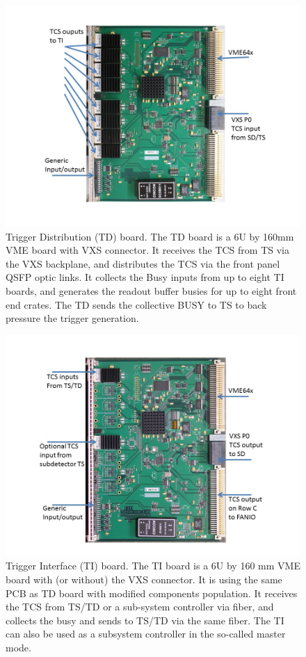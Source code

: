 \begin{figure}[hbt]
	\centering
	\includegraphics[width=1.0\columnwidth,keepaspectratio]{img/TDused.jpg}
	\caption{Trigger Distribution (TD) board.  The TD board is a 6U by 160mm VME board with VXS connector.  It receives the TCS from TS via the VXS backplane, and distributes the TCS via the front panel QSFP optic links.  It collects the Busy inputs from up to eight TI boards, and generates the readout buffer busies for up to eight front end crates.  The TD sends the collective BUSY to TS to back pressure the trigger generation.}
	\label{fig:TDused}
\end{figure}

\begin{figure}[hbt]
	\centering
	\includegraphics[width=1.0\columnwidth,keepaspectratio]{img/TIused.jpg}
	\caption{Trigger Interface (TI) board.  The TI board is a 6U by 160 mm VME board with (or without) the VXS connector.  It is using the same PCB as TD board with modified components population.  It receives the TCS from TS/TD or a sub-system controller via fiber, and collects the busy and sends to TS/TD via the same fiber.  The TI can also be used as a subsystem controller in the so-called master mode.}
	\label{fig:TIused}
\end{figure}

